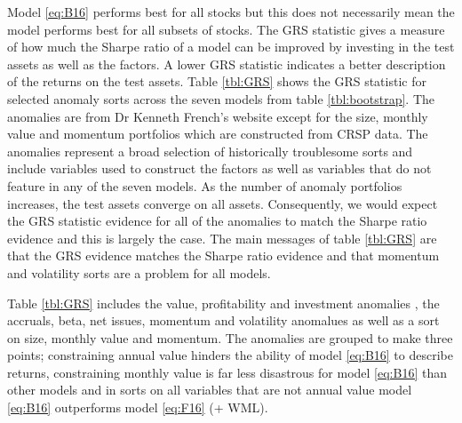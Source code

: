 

Model \ref{eq:B16} performs best for all stocks but this does not necessarily
mean the model performs best for all subsets of stocks.
The GRS statistic gives a measure of how much the Sharpe ratio of a model can
be improved by investing in the test assets as well as the factors.
A lower GRS statistic indicates a better description of the returns on the
test assets.
Table \ref{tbl:GRS} shows the GRS statistic for selected anomaly sorts across
the seven models from table \ref{tbl:bootstrap}.
The anomalies are from Dr Kenneth French's website except for the size, monthly
value and momentum  portfolios which are constructed from CRSP data.
The anomalies represent a broad selection of historically troublesome sorts and
include variables used to construct the factors as well as variables that do
not feature in any of the seven models.
As the number of anomaly portfolios increases, the test assets converge on
all assets.
Consequently, we would expect the GRS statistic evidence for all of the
anomalies to match the Sharpe ratio evidence and this is largely the case.
The main messages of table \ref{tbl:GRS} are that the GRS evidence matches the
Sharpe ratio evidence and that momentum and volatility sorts are a problem for
all models.

Table \ref{tbl:GRS} includes the value, profitability and investment anomalies
\parencite{fama2006profitability, fama2015five},
the accruals, beta, net issues, momentum and volatility anomalues
\parencite{fama2016dissecting} as well as a sort on size, monthly value and
momentum.
The anomalies are grouped to make three points;
constraining annual value hinders the ability of model \ref{eq:B16} to describe
returns,
constraining monthly value is far less disastrous for model \ref{eq:B16}
than other models and
in sorts on all variables that are not annual value
model \ref{eq:B16} outperforms model \ref{eq:F16} (+ WML).

